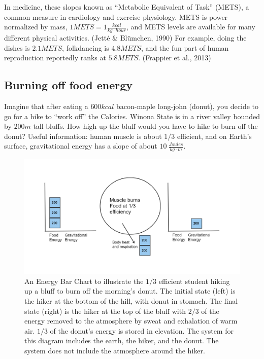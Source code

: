 \documentclass[man]{apa7}
\begin{document}
In medicine, these slopes known as ``Metabolic Equivalent of Task'' (METS), a common measure in cardiology and exercise physiology.  METS is power normalized by mass, $1METS=1\frac{kcal}{kg\cdot hour}$, and METS levels are available for many different physical activities. (Jetté \& Blümchen, 1990) For example, doing the dishes is $2.1METS$, folkdancing is $4.8METS$, and the fun part of human reproduction reportedly ranks at $5.8METS$. (Frappier et al., 2013)

\subsection{Burning off food energy}
Imagine that after eating a $600kcal$ bacon-maple long-john (donut), you decide to go for a hike to ``work off'' the Calories.  
Winona State  is in a river valley bounded by $200m$ tall bluffs.  How high up the bluff would you have to hike to burn off the donut?  
Useful information: human muscle is about $1/3$ efficient, and on Earth's surface, gravitational energy has a slope of about $10~\frac{Joules}{kg\cdot m}$.

\begin{figure}[h]
\centering
\includegraphics[width=\columnwidth]{bar_chart.png}
\caption{An Energy Bar Chart to illustrate the $1/3$ efficient student hiking up a bluff to burn off the morning's donut.  The initial state (left) is the hiker at the bottom of the hill, with donut in stomach.  The final state (right) is the hiker at the top of the bluff with $2/3$ of the energy removed to the atmosphere by sweat and exhalation of warm air. $1/3$ of the donut's energy is stored in elevation.  The system for this diagram includes the earth, the hiker, and the donut.  The system does not include the atmosphere around the hiker.  
}
\label{bar_chart}
\end{figure}
\end{document}
